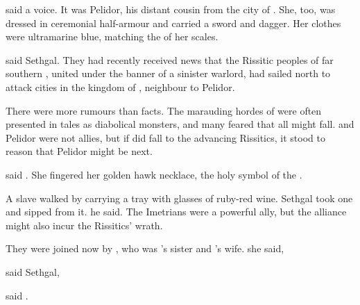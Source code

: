 \ta{\Rah[Sethgal],} said a voice. 
It was \rah[\Dornaer] Pelidor, his distant cousin from the city of \Forclin. 
She, too, was dressed in ceremonial half-armour and carried a sword and dagger. 
Her clothes were ultramarine blue, matching the \colour of her scales. 

 said Sethgal. 
They had recently received news that the Rissitic peoples of far southern \Durcac, united under the banner of a sinister warlord, had sailed north to attack cities in the kingdom of \Scyrum, neighbour to Pelidor. 

There were more rumours than facts. 
The marauding hordes of \Durcac were often presented in tales as diabolical monsters, and many feared that all \Scyrum might fall. 
\Scyrum and Pelidor were not allies, but if \Scyrum did fall to the advancing Rissitics, it stood to reason that Pelidor might be next. 

 said \Dornaer. 
She fingered her golden hawk necklace, the holy symbol of the \sephirah \Izion. 

A \human slave walked by carrying a tray with glasses of ruby-red wine.
Sethgal took one and sipped from it. 
 he said. 
The Imetrians were a powerful ally, but the alliance might also incur the Rissitics' wrath. 

They were joined now by \rinyuth[\Tiroco], who was \Dornaer's sister and \Icor's wife.
 she said,

 said Sethgal, 

 said \Dornaer.

